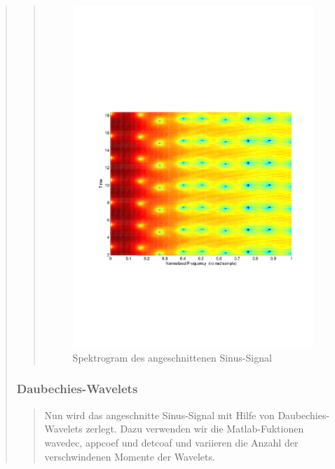 \begin{quote}
\begin{quote}
        \begin{figure}[H]
                    \centering
                        \includegraphics[scale=0.5, trim = 1cm 7cm 1.5cm 8cm,
                        clip]{./Bilder/Termin8/Spectrogam}
                        \caption{Spektrogram des angeschnittenen Sinus-Signal}
                    \end{figure} 
        \end{quote}%
        
        
        \subsubsection{Daubechies-Wavelets}
        \begin{quote}
        
        Nun wird das angeschnitte Sinus-Signal mit Hilfe von Daubechies-Wavelets
        zerlegt. Dazu verwenden wir die Matlab-Fuktionen wavedec, appcoef
        und detcoaf und variieren die Anzahl der verschwindenen
        Momente der Wavelets.
        

\end{quote}
\end{quote}
